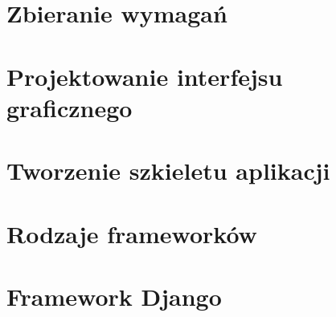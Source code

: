 \section{Zbieranie wymagań}

\section{Projektowanie interfejsu graficznego}

\section{Tworzenie szkieletu aplikacji}

\section{Rodzaje frameworków}

\section{Framework Django}